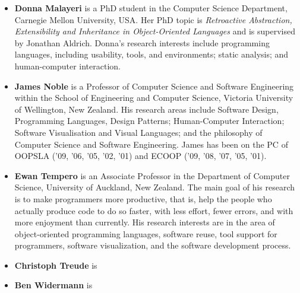 \documentclass{sigplanconf}
\begin{document}
\begin{itemize}



\item \textbf{Donna Malayeri} is a PhD student in the Computer Science
  Department, Carnegie Mellon University, USA. Her PhD topic is
  \emph{Retroactive Abstraction, Extensibility and Inheritance in
    Object-Oriented Languages} and is supervised by Jonathan
  Aldrich. Donna's research interests include programming languages,
  including usability, tools, and environments; static analysis; and
  human-computer interaction.

\item \textbf{James Noble} is a Professor of Computer Science and
  Software Engineering within the School of Engineering and Computer
  Science, Victoria University of Wellington, New Zealand.  His
  research areas include Software Design, Programming Languages,
  Design Patterns; Human-Computer Interaction; Software Visualisation
  and Visual Languages; and the philosophy of Computer Science and
  Software Engineering. James has been on the PC of OOPSLA ('09, '06,
  '05, '02, '01) and ECOOP ('09, '08, '07, '05, '01).

\item \textbf{Ewan Tempero} is an Associate Professor in the
  Department of Computer Science, University of Auckland, New
  Zealand. The main goal of his research is to make programmers more
  productive, that is, help the people who actually produce code to do
  so faster, with less effort, fewer errors, and with more enjoyment
  than currently. His research interests are in the area of
  object-oriented programming languages, software reuse, tool support
  for programmers, software visualization, and the software
  development process.

\item \textbf{Christoph Treude} is

\item \textbf{Ben Widermann} is

\end{itemize}
\end{document}
